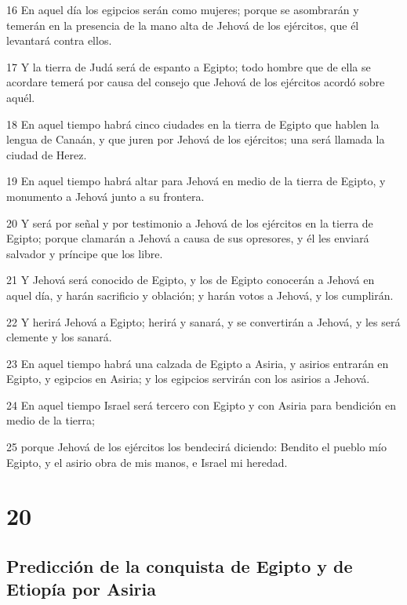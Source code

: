 \par 16 En aquel día los egipcios serán como mujeres; porque se asombrarán y temerán en la presencia de la mano alta de Jehová de los ejércitos, que él levantará contra ellos.
\par 17 Y la tierra de Judá será de espanto a Egipto; todo hombre que de ella se acordare temerá por causa del consejo que Jehová de los ejércitos acordó sobre aquél.
\par 18 En aquel tiempo habrá cinco ciudades en la tierra de Egipto que hablen la lengua de Canaán, y que juren por Jehová de los ejércitos; una será llamada la ciudad de Herez.
\par 19 En aquel tiempo habrá altar para Jehová en medio de la tierra de Egipto, y monumento a Jehová junto a su frontera.
\par 20 Y será por señal y por testimonio a Jehová de los ejércitos en la tierra de Egipto; porque clamarán a Jehová a causa de sus opresores, y él les enviará salvador y príncipe que los libre.
\par 21 Y Jehová será conocido de Egipto, y los de Egipto conocerán a Jehová en aquel día, y harán sacrificio y oblación; y harán votos a Jehová, y los cumplirán.
\par 22 Y herirá Jehová a Egipto; herirá y sanará, y se convertirán a Jehová, y les será clemente y los sanará.
\par 23 En aquel tiempo habrá una calzada de Egipto a Asiria, y asirios entrarán en Egipto, y egipcios en Asiria; y los egipcios servirán con los asirios a Jehová.
\par 24 En aquel tiempo Israel será tercero con Egipto y con Asiria para bendición en medio de la tierra;
\par 25 porque Jehová de los ejércitos los bendecirá diciendo: Bendito el pueblo mío Egipto, y el asirio obra de mis manos, e Israel mi heredad. 


\chapter{20}

\section*{Predicción de la conquista de Egipto y de Etiopía por Asiria}

